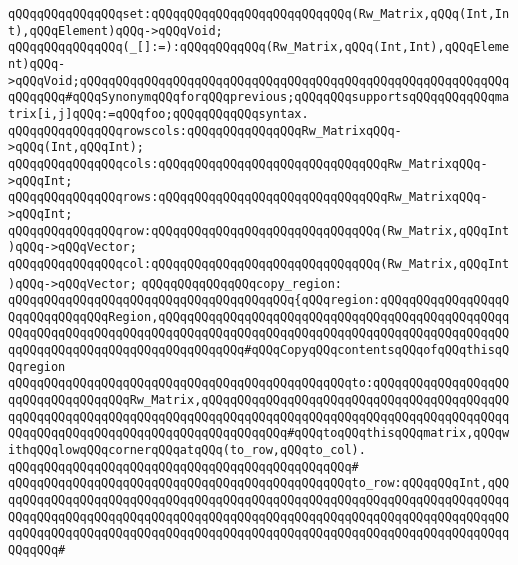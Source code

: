 \newline
\verb|qQQqqQQqqQQqqQQqset:qQQqqQQqqQQqqQQqqQQqqQQqqQQq(Rw_Matrix,qQQq(Int,Int),qQQqElement)qQQq->qQQqVoid;|\newline
\verb|qQQqqQQqqQQqqQQq(_[]:=):qQQqqQQqqQQq(Rw_Matrix,qQQq(Int,Int),qQQqElement)qQQq->qQQqVoid;qQQqqQQqqQQqqQQqqQQqqQQqqQQqqQQqqQQqqQQqqQQqqQQqqQQqqQQqqQQqqQQqqQQq#qQQqSynonymqQQqforqQQqprevious;qQQqqQQqsupportsqQQqqQQqqQQqmatrix[i,j]qQQq:=qQQqfoo;qQQqqQQqqQQqsyntax.|\newline
\newline
\verb|qQQqqQQqqQQqqQQqrowscols:qQQqqQQqqQQqqQQqRw_MatrixqQQq->qQQq(Int,qQQqInt);|\newline
\verb|qQQqqQQqqQQqqQQqcols:qQQqqQQqqQQqqQQqqQQqqQQqqQQqqQQqRw_MatrixqQQq->qQQqInt;|\newline
\verb|qQQqqQQqqQQqqQQqrows:qQQqqQQqqQQqqQQqqQQqqQQqqQQqqQQqRw_MatrixqQQq->qQQqInt;|\newline
\newline
\verb|qQQqqQQqqQQqqQQqrow:qQQqqQQqqQQqqQQqqQQqqQQqqQQqqQQq(Rw_Matrix,qQQqInt)qQQq->qQQqVector;|\newline
\verb|qQQqqQQqqQQqqQQqcol:qQQqqQQqqQQqqQQqqQQqqQQqqQQqqQQq(Rw_Matrix,qQQqInt)qQQq->qQQqVector;|\newline
\newline
\verb|qQQqqQQqqQQqqQQqcopy_region:|\newline
\verb|qQQqqQQqqQQqqQQqqQQqqQQqqQQqqQQqqQQqqQQq{qQQqregion:qQQqqQQqqQQqqQQqqQQqqQQqqQQqqQQqRegion,qQQqqQQqqQQqqQQqqQQqqQQqqQQqqQQqqQQqqQQqqQQqqQQqqQQqqQQqqQQqqQQqqQQqqQQqqQQqqQQqqQQqqQQqqQQqqQQqqQQqqQQqqQQqqQQqqQQqqQQqqQQqqQQqqQQqqQQqqQQqqQQqqQQqqQQq#qQQqCopyqQQqcontentsqQQqofqQQqthisqQQqregion|\newline
\verb|qQQqqQQqqQQqqQQqqQQqqQQqqQQqqQQqqQQqqQQqqQQqqQQqto:qQQqqQQqqQQqqQQqqQQqqQQqqQQqqQQqqQQqRw_Matrix,qQQqqQQqqQQqqQQqqQQqqQQqqQQqqQQqqQQqqQQqqQQqqQQqqQQqqQQqqQQqqQQqqQQqqQQqqQQqqQQqqQQqqQQqqQQqqQQqqQQqqQQqqQQqqQQqqQQqqQQqqQQqqQQqqQQqqQQqqQQqqQQqqQQqqQQq#qQQqtoqQQqthisqQQqmatrix,qQQqwithqQQqlowqQQqcornerqQQqatqQQq(to_row,qQQqto_col).|\newline
\verb|qQQqqQQqqQQqqQQqqQQqqQQqqQQqqQQqqQQqqQQqqQQqqQQq#|\newline
\verb|qQQqqQQqqQQqqQQqqQQqqQQqqQQqqQQqqQQqqQQqqQQqqQQqto_row:qQQqqQQqInt,qQQqqQQqqQQqqQQqqQQqqQQqqQQqqQQqqQQqqQQqqQQqqQQqqQQqqQQqqQQqqQQqqQQqqQQqqQQqqQQqqQQqqQQqqQQqqQQqqQQqqQQqqQQqqQQqqQQqqQQqqQQqqQQqqQQqqQQqqQQqqQQqqQQqqQQqqQQqqQQqqQQqqQQqqQQqqQQqqQQqqQQqqQQqqQQqqQQqqQQqqQQqqQQqqQQqqQQqqQQq#|\newline

